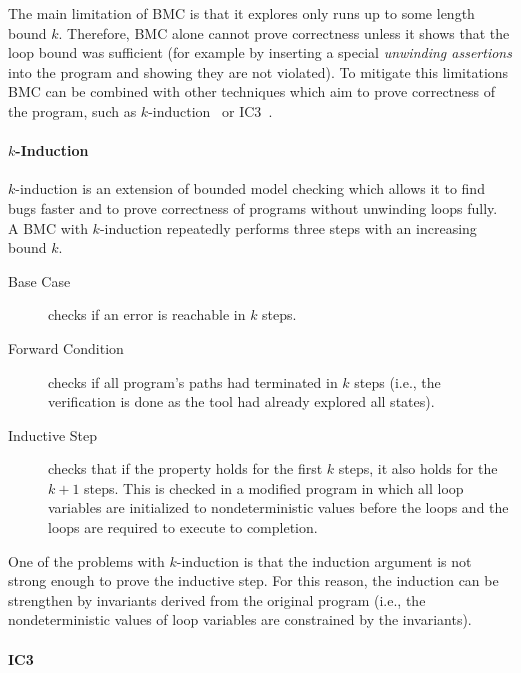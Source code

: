 The main limitation of BMC is that it explores only runs up to some length
bound $k$.
Therefore, BMC alone cannot prove correctness unless it shows that the loop
bound was sufficient (for example by inserting a special \emph{unwinding
assertions} into the program and showing they are not violated).
To mitigate this limitations BMC can be combined with other techniques which
aim to prove correctness of the program, such as $k$-induction~\cite{TODO} or
IC3~\cite{TODO}.

\paragraph{$k$-Induction}

$k$-induction is an extension of bounded model checking which allows it to find bugs faster and to prove correctness of programs without unwinding loops fully.
A BMC with $k$-induction repeatedly performs three steps with an increasing bound $k$.
\begin{description}
    \item[Base Case] checks if an error is reachable in $k$ steps.
    \item[Forward Condition] checks if all program's paths had terminated in
        $k$ steps (i.e., the verification is done as the tool had already
        explored all states).
    \item[Inductive Step] checks that if the property holds for the first $k$
        steps, it also holds for the $k+1$ steps.
        This is checked in a modified program in which all loop variables are
        initialized to nondeterministic values before the loops and the loops
        are required to execute to completion.
\end{description}
One of the problems with $k$-induction is that the induction argument is not strong enough to prove the inductive step.
For this reason, the induction can be strengthen by invariants derived from the original program (i.e., the nondeterministic values of loop variables are constrained by the invariants).

\paragraph{IC3} 

